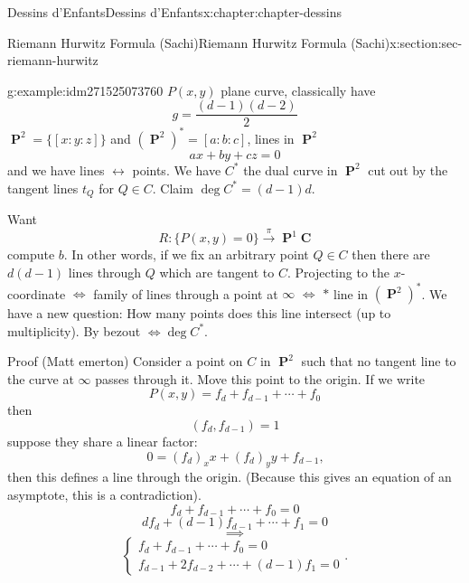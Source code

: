 \documentclass[oneside,10pt,]{book}
\numberwithin{equation}{section}
\newcommand{\lb}{[}
\newcommand{\rb}{]}
\newcommand{\CC}{\mathbf{C}}
\DeclareMathOperator{\PP}{\mathbf{P}}
\begin{document}
\begin{chapterptx}{Dessins d'Enfants}{}{Dessins d'Enfants}{}{}{x:chapter:chapter-dessins}
\begin{sectionptx}{Riemann Hurwitz Formula (Sachi)}{}{Riemann Hurwitz Formula (Sachi)}{}{}{x:section:sec-riemann-hurwitz}
\begin{example}{}{g:example:idm271525073760}%
\(P(x,y)\) plane curve, classically have%
\begin{equation*}
g = \frac{(d-1)(d-2)}{2}
\end{equation*}
\(\PP^2 = \{ \lb x:y:z \rb\}\) and \((\PP^2)^* = \lb a:b:c \rb\), lines in \(\PP^2\)%
\begin{equation*}
ax + by + cz = 0
\end{equation*}
and we have lines \(\leftrightarrow\) points. We have \(C^*\) the dual curve in \(\PP^2\) cut out by the tangent lines \(t_Q\) for \(Q \in C\). Claim \(\deg C^* = (d-1)d\).%
\par
Want%
\begin{equation*}
R:\{P(x,y) = 0\} \xrightarrow\pi \PP^1\CC
\end{equation*}
compute \(b\). In other words, if we fix an arbitrary point \(Q\in C\) then there are \(d(d-1)\) lines through \(Q\) which are tangent to \(C\). Projecting to the \(x\)-coordinate \(\iff\) family of lines through a point at \(\infty\) \(\iff\) \(\ast\) line in \((\PP^2)^*\). We have a new question: How many points does this line intersect (up to multiplicity). By bezout \(\iff  \deg C^*\).%
\par
Proof (Matt emerton) Consider a point on \(C\) in \(\PP^2\) such that no tangent line to the curve at   \(\infty\) passes through it. Move this point to the origin. If we write%
\begin{equation*}
P(x,y) = f_d + f_{d-1} + \cdots + f_0
\end{equation*}
then%
\begin{equation*}
(f_d, f_{d-1}) = 1
\end{equation*}
suppose they share a linear factor:%
\begin{equation*}
0 = (f_d)_x x + (f_d)_y y + f_{d-1}\text{,}
\end{equation*}
then this defines a line through the origin. (Because this gives an equation of an asymptote, this is a contradiction).%
\begin{equation*}
f_d + f_{d-1} + \cdots + f_0 = 0
\end{equation*}
%
\begin{equation*}
d f_d + (d-1) f_{d-1} + \cdots + f_1 = 0
\end{equation*}
%
\begin{equation*}
\implies
\end{equation*}
%
\begin{equation*}
\begin{cases}  f_d + f_{d-1} + \cdots + f_0 = 0 \\ f_{d-1} + 2f_{d-2} + \cdots + (d-1) f_1 = 0\end{cases}\text{.}

\end{equation*}
\end{example}
\end{sectionptx}
\end{chapterptx}
\end{document}
